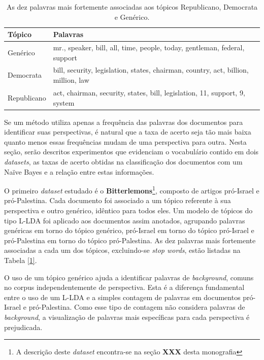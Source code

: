 \begin{table}[h]
\centering
\begin{tabular}{| l | p{10cm} | }
\hline
Tópico & Palavras \\ \hline
Genérico & mr., speaker, bill, all, time, people, today, gentleman, federal, support \\ \hline
Democrata & bill, security, legislation, states, chairman, country, act, billion, million, law \\ \hline
Republicano & act, chairman, security, states, bill, legislation, 11, support, 9, system \\ \hline
\end{tabular}
\label{2}
\caption{As dez palavras mais fortemente associadas aos tópicos Republicano, Democrata e Genérico.}
\end{table}

Se um método utiliza apenas a frequência das palavras dos documentos para identificar suas perspectivas, é natural que a taxa de acerto seja tão mais baixa quanto menos essas frequências mudam de uma perspectiva para outra. Nesta seção, serão descritos experimentos que evidenciam o vocabulário contido em dois \emph{datasets}, as taxas de acerto obtidas na classificação dos documentos com um Naïve Bayes e a relação entre estas informações.

O primeiro \emph{dataset} estudado é o \textbf{Bitterlemons}\footnote{A descrição deste \emph{dataset} encontra-se na seção \textbf{XXX} desta monografia}, composto de artigos pró-Israel e pró-Palestina. Cada documento foi associado a um tópico referente à sua perspectiva e outro genérico, idêntico para todos eles. Um modelo de tópicos do tipo L-LDA foi aplicado aos documentos assim anotados, agrupando palavras genéricas em torno do tópico genérico, pró-Israel em torno do tópico pró-Israel e pró-Palestina em torno do tópico pró-Palestina. As dez palavras mais fortemente associadas a cada um dos tópicos, excluindo-se \emph{stop words}, estão listadas na Tabela \ref{1}.

O uso de um tópico genérico ajuda a identificar palavras de \emph{background}, comuns no corpus independentemente de perspectiva. Esta é a diferença fundamental entre o uso de um L-LDA e a simples contagem de palavras em documentos pró-Israel e pró-Palestina. Como esse tipo de contagem não considera palavras de \emph{background}, a visualização de palavras mais específicas para cada perspectiva é prejudicada.

